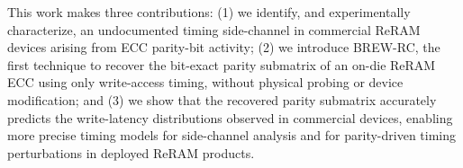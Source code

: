 
This work makes three contributions: (1) we identify, and experimentally characterize, an undocumented timing side-channel in commercial ReRAM devices arising from ECC parity-bit activity; (2) we introduce BREW-RC, the first technique to recover the bit-exact parity submatrix of an on-die ReRAM ECC using only write-access timing, without physical probing or device modification; and (3) we show that the recovered parity submatrix accurately predicts the write-latency distributions observed in commercial devices, enabling more precise timing models for side-channel analysis and for  parity-driven timing perturbations in deployed ReRAM products.

